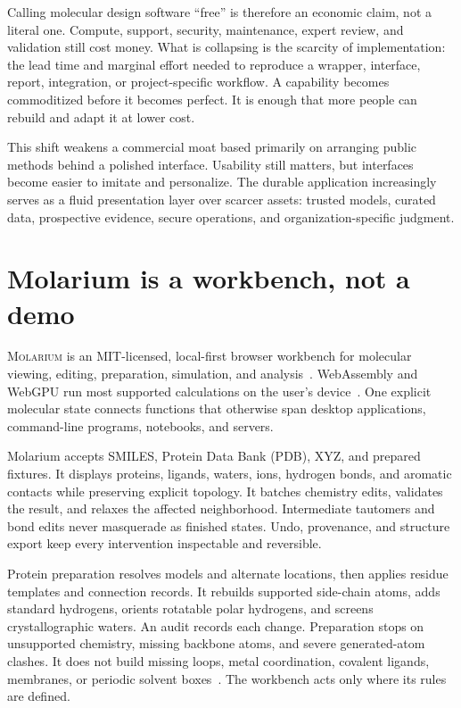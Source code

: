 \documentclass[10pt]{article}
\newcommand{\molarium}{\textsc{Molarium}}
\begin{document}
Calling molecular design software ``free'' is therefore an economic claim, not a literal one.
Compute, support, security, maintenance, expert review, and validation still cost money.
What is collapsing is the scarcity of implementation: the lead time and marginal effort needed to reproduce a wrapper, interface, report, integration, or project-specific workflow.
A capability becomes commoditized before it becomes perfect.
It is enough that more people can rebuild and adapt it at lower cost.

This shift weakens a commercial moat based primarily on arranging public methods behind a polished interface.
Usability still matters, but interfaces become easier to imitate and personalize.
The durable application increasingly serves as a fluid presentation layer over scarcer assets: trusted models, curated data, prospective evidence, secure operations, and organization-specific judgment.

\section*{Molarium is a workbench, not a demo}

\molarium{} is an MIT-licensed, local-first browser workbench for molecular viewing, editing, preparation, simulation, and analysis~\cite{molarium2026}.
WebAssembly and WebGPU run most supported calculations on the user's device~\cite{haas2017webassembly,w3c2025webgpu}.
One explicit molecular state connects functions that otherwise span desktop applications, command-line programs, notebooks, and servers.

Molarium accepts SMILES, Protein Data Bank (PDB), XYZ, and prepared fixtures.
It displays proteins, ligands, waters, ions, hydrogen bonds, and aromatic contacts while preserving explicit topology.
It batches chemistry edits, validates the result, and relaxes the affected neighborhood.
Intermediate tautomers and bond edits never masquerade as finished states.
Undo, provenance, and structure export keep every intervention inspectable and reversible.

Protein preparation resolves models and alternate locations, then applies residue templates and connection records.
It rebuilds supported side-chain atoms, adds standard hydrogens, orients rotatable polar hydrogens, and screens crystallographic waters.
An audit records each change.
Preparation stops on unsupported chemistry, missing backbone atoms, and severe generated-atom clashes.
It does not build missing loops, metal coordination, covalent ligands, membranes, or periodic solvent boxes~\cite{molarium2026}.
The workbench acts only where its rules are defined.
\end{document}
